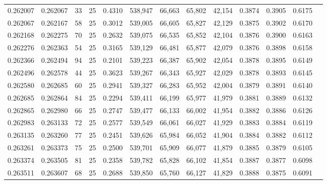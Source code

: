 \begin{tabular}{rrrrrrrrrrrrr}
0.262007 & 0.262067 &    33 &  25 &                                     0.4310 & 538,947 &  66,663 &  65,802 &  42,154 & 0.3874 & 0.3905 & 0.6175 \\
0.262067 & 0.262167 &    58 &  25 &                                     0.3012 & 539,005 &  66,605 &  65,827 &  42,129 & 0.3875 & 0.3902 & 0.6170 \\
0.262168 & 0.262275 &    70 &  25 &                                     0.2632 & 539,075 &  66,535 &  65,852 &  42,104 & 0.3876 & 0.3900 & 0.6163 \\
0.262276 & 0.262363 &    54 &  25 &                                     0.3165 & 539,129 &  66,481 &  65,877 &  42,079 & 0.3876 & 0.3898 & 0.6158 \\
0.262366 & 0.262494 &    94 &  25 &                                     0.2101 & 539,223 &  66,387 &  65,902 &  42,054 & 0.3878 & 0.3895 & 0.6149 \\
0.262496 & 0.262578 &    44 &  25 &                                     0.3623 & 539,267 &  66,343 &  65,927 &  42,029 & 0.3878 & 0.3893 & 0.6145 \\
0.262580 & 0.262685 &    60 &  25 &                                     0.2941 & 539,327 &  66,283 &  65,952 &  42,004 & 0.3879 & 0.3891 & 0.6140 \\
0.262685 & 0.262864 &    84 &  25 &                                     0.2294 & 539,411 &  66,199 &  65,977 &  41,979 & 0.3881 & 0.3889 & 0.6132 \\
0.262865 & 0.262980 &    66 &  25 &                                     0.2747 & 539,477 &  66,133 &  66,002 &  41,954 & 0.3882 & 0.3886 & 0.6126 \\
0.262983 & 0.263133 &    72 &  25 &                                     0.2577 & 539,549 &  66,061 &  66,027 &  41,929 & 0.3883 & 0.3884 & 0.6119 \\
0.263135 & 0.263260 &    77 &  25 &                                     0.2451 & 539,626 &  65,984 &  66,052 &  41,904 & 0.3884 & 0.3882 & 0.6112 \\
0.263261 & 0.263373 &    75 &  25 &                                     0.2500 & 539,701 &  65,909 &  66,077 &  41,879 & 0.3885 & 0.3879 & 0.6105 \\
0.263374 & 0.263505 &    81 &  25 &                                     0.2358 & 539,782 &  65,828 &  66,102 &  41,854 & 0.3887 & 0.3877 & 0.6098 \\
0.263511 & 0.263607 &    68 &  25 &                                     0.2688 & 539,850 &  65,760 &  66,127 &  41,829 & 0.3888 & 0.3875 & 0.6091 \\

\end{tabular}
